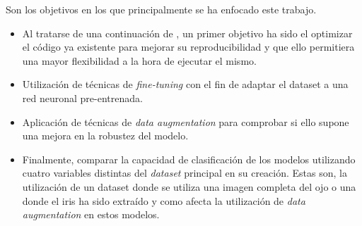  \label{capitulo2}

Son los objetivos en los que principalmente se ha enfocado este trabajo.

\begin{itemize}
    \item Al tratarse de una continuación de \cite{tfg_iris_2020}, un primer objetivo ha sido el optimizar el código ya existente para 
    mejorar su reproducibilidad y que ello permitiera una mayor flexibilidad a la hora de ejecutar el mismo.
    \item Utilización de técnicas de \textit{fine-tuning} con el fin de adaptar el dataset a una red neuronal pre-entrenada.
    \item Aplicación de técnicas de \textit{data augmentation} para comprobar si ello supone una mejora en la robustez del modelo.
    \item Finalmente, comparar la capacidad de clasificación de los modelos utilizando cuatro variables distintas del \textit{dataset} principal en su creación. Estas son, la utilización de un dataset donde se utiliza una imagen completa del ojo o una donde el iris ha sido extraído y como afecta la utilización de \textit{data augmentation} en estos modelos.                                                                                                                                                                                                           
\end{itemize}

